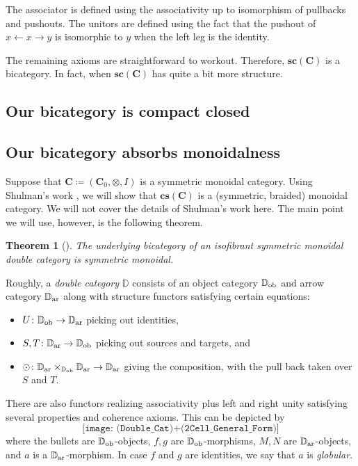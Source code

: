 \documentclass[11pt]{amsart}
\newcommand{\DD}{\mathbb{D}}
\newcommand{\cat}[1]{\mathbf{#1}}
\renewcommand{\t}[1]{\textup{#1}}
\newcommand{\from}{\colon}
\newtheorem{thm}{Theorem}[section]
\theoremstyle{remark}
\theoremstyle{definition}
\begin{document}
{The associator is defined using the associativity up to isomorphism of pullbacks and pushouts.  The unitors are defined using the fact that the pushout of $x \gets x \to y$ is isomorphic to $y$ when the left leg is the identity.  

The remaining axioms are straightforward to workout. Therefore, $\cat{sc}(\cat{C})$ is a bicategory. In fact, when $\cat{sc}(\cat{C})$ has quite a bit more structure.

\subsection{Our bicategory is compact closed}  


\subsection{Our bicategory absorbs monoidalness}  

Suppose that $\cat{C} \coloneqq (\cat{C}_0, \otimes, I)$ is a symmetric monoidal category.  Using Shulman's work \cite{Shul}, we will show that $\cat{cs}(\cat{C})$ is a (symmetric, braided) monoidal category. We will not cover the details of Shulman's work here.  The main point we will use, however, is the following theorem.

\begin{thm}[{\cite[{Thm.~1.2}]{Shul}}]
\label{thm:Shulmans thm}
	The underlying bicategory of an isofibrant symmetric monoidal double category is symmetric monoidal.  
\end{thm}

Roughly, a \emph{double category} $\DD$ consists of an object category $\DD_\t{ob}$ and arrow category $\DD_\t{ar}$ along with structure functors satisfying certain equations:
\begin{itemize}
	\item $U \from \DD_\t{ob} \to \DD_\t{ar}$ picking out identities,
	\item $S,T \from \DD_\t{ar} \to \DD_\t{ob}$ picking out sources and targets, and
	\item $\odot \from \DD_\t{ar} \times_{\DD_\t{ob}} \DD_\t{ar} \to \DD_\t{ar}$ giving the composition, with the pull back taken over $S$ and $T$.
\end{itemize}
There are also functors realizing associativity plus left and right unity satisfying several properties and coherence axioms.  This can be depicted by
\[
	\texttt{[image: (Double\_Cat)+(2Cell\_General\_Form)]}
\]
where the bullets are $\DD_\t{ob}$-objects, $f,g$ are $\DD_\t{ob}$-morphisms, $M,N$ are $\DD_\t{ar}$-objects, and $a$ is a $\DD_\t{ar}$-morphism.  In case $f$ and $g$ are identities, we say that $a$ is \emph{globular}.

}
\end{document}

